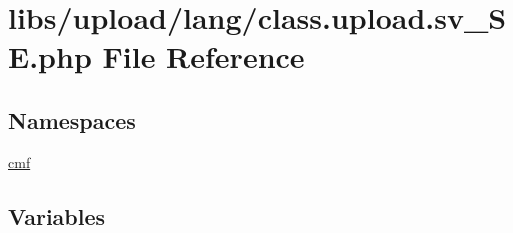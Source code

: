 \hypertarget{class_8upload_8sv___s_e_8php}{}\section{libs/upload/lang/class.upload.\+sv\+\_\+\+S\+E.\+php File Reference}
\label{class_8upload_8sv___s_e_8php}
\subsection*{Namespaces}
\begin{DoxyCompactItemize}
\item 
 \hyperlink{namespacecmf}{cmf}
\end{DoxyCompactItemize}
\subsection*{Variables}
